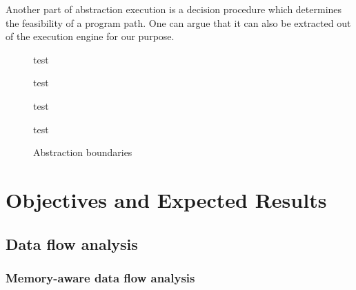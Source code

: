 Another part of abstraction execution is a decision procedure which determines
the feasibility of a program path. One can argue that it can also be extracted
out of the execution engine for our purpose.

\begin{figure}[h]
    \begin{minipage}[t]{0.45\textwidth}
        test
    \begin{tikzpicture}
    \end{tikzpicture}
    \end{minipage}
    \hfill
    \begin{minipage}[t]{0.45\textwidth}
        test
    \begin{tikzpicture}
    \end{tikzpicture}
    \end{minipage}

    \begin{minipage}[t]{0.45\textwidth}
        test
    \begin{tikzpicture}
    \end{tikzpicture}
    \end{minipage}
    \hfill
    \begin{minipage}[t]{0.45\textwidth}
        test
    \begin{tikzpicture}
    \end{tikzpicture}
    \end{minipage}

\caption{Abstraction boundaries}
\end{figure}



\section{Objectives and Expected Results}
\label{sec:objectives}

\subsection{Data flow analysis}

\subsubsection{Memory-aware data flow analysis}

